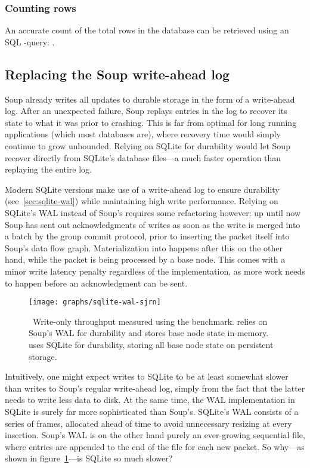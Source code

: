 \subsubsection{Counting rows}

An accurate count of the total rows in the database can be retrieved using an
SQL -query: .

\subsection{Replacing the Soup write-ahead log}\label{sec:sqlite-vs-soup}

Soup already writes all updates to durable storage in the form of a write-ahead
log. After an unexpected failure, Soup replays entries in the log to recover its
state to what it was prior to crashing. This is far from optimal for long
running applications (which most databases are), where recovery time would
simply continue to grow unbounded. Relying on SQLite for durability would let
Soup recover directly from SQLite's database files---a much faster operation
than replaying the entire log.

Modern SQLite versions make use of a write-ahead log to ensure durability
(see~\ref{sec:sqlite-wal}) while maintaining high write performance. Relying on
SQLite's WAL instead of Soup's requires some refactoring however: up until now
Soup has sent out acknowledgments of writes as soon as the write is merged into
a batch by the group commit protocol, prior to inserting the packet itself into
Soup's data flow graph. Materialization into  happens
after this on the other hand, while the packet is being processed by a base
node. This comes with a minor write latency penalty regardless of the
 implementation, as more work needs to happen before an
acknowledgment can be sent.

\begin{figure}[H]
  \centering
  \texttt{[image: graphs/sqlite-wal-sjrn]}
  \caption{\
    Write-only throughput measured using the  benchmark. 
    relies on Soup's WAL for durability and stores base node state in-memory.
    \code{sqlite\_wal} uses SQLite for durability, storing all base node state
    on persistent storage.
  }\label{graph:sqlite-wal}
\end{figure}

Intuitively, one might expect writes to SQLite to be at least somewhat slower
than writes to Soup's regular write-ahead log, simply from the fact that the
latter needs to write less data to disk. At the same time, the WAL
implementation in SQLite is surely far more sophisticated than Soup's. SQLite's
WAL consists of a series of frames, allocated ahead of time to avoid unnecessary
resizing at every insertion. Soup's WAL is on the other hand purely an
ever-growing sequential file, where entries are appended to the end of the file
for each new packet. So why---as shown in figure~\ref{graph:sqlite-wal}---is
SQLite so much slower?

